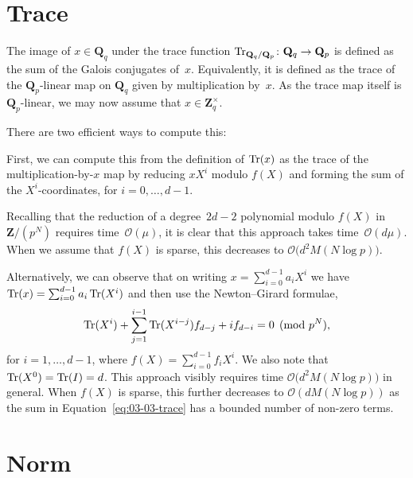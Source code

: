 \section{Trace}

The image of $x \in \mathbf{Q}_q$ under the trace function 
$\operatorname{Tr}_{\mathbf{Q}_q/\mathbf{Q}_p} \colon \mathbf{Q}_q \rightarrow \mathbf{Q}_p$ 
is defined as the sum of the Galois conjugates of~$x$.  Equivalently, 
it is defined as the trace of the $\mathbf{Q}_p$-linear map on 
$\mathbf{Q}_q$ given by multiplication by~$x$.  As the trace map 
itself is $\mathbf{Q}_p$-linear, we may now assume that 
$x \in \mathbf{Z}_q^{\times}$.

There are two efficient ways to compute this:

First, we can compute this from the definition of $\operatorname{Tr}(x)$ as the trace 
of the multiplication-by-$x$ map by reducing $x X^i$ modulo $f(X)$ and forming 
the sum of the $X^i$-coordinates, for $i = 0, \dotsc, d - 1$.

Recalling that the reduction of a degree~$2d-2$ polynomial modulo 
$f(X)$ in $\mathbf{Z}/(p^N)$ requires time~$\mathcal{O}(\mu)$, 
it is clear that this approach takes time~$\mathcal{O}(d \mu)$. 
When we assume that $f(X)$ is sparse, this decreases to 
$\mathcal{O}\bigl(d^2 M(N \log p)\bigr)$.

Alternatively, we can observe that on writing $x = \sum_{i=0}^{d-1} a_i X^i$ 
we have $\operatorname{Tr}(x) = \sum_{i=0}^{d-1} a_i \operatorname{Tr}(X^i)$ and then use the 
Newton--Girard formulae,
\begin{equation} \label{eq:03-03-trace}
\operatorname{Tr}(X^i) + \sum_{j=1}^{i-1} \operatorname{Tr}(X^{i-j}) f_{d-j} + i f_{d-i} = 0 \pmod{p^N}, 
\end{equation}
for $i = 1, \dotsc, d-1$, where $f(X) = \sum_{i=0}^{d-1} f_i X^i$.  
We also note that $\operatorname{Tr}(X^0) = \operatorname{Tr}(I) = d$.  This approach visibly 
requires time $\mathcal{O}\bigl(d^2 M(N \log p)\bigr)$ in general.  When 
$f(X)$ is sparse, this further decreases to $\mathcal{O}(d M(N \log p))$ as 
the sum in Equation~\eqref{eq:03-03-trace} has a bounded number of 
non-zero terms.

\section{Norm}


